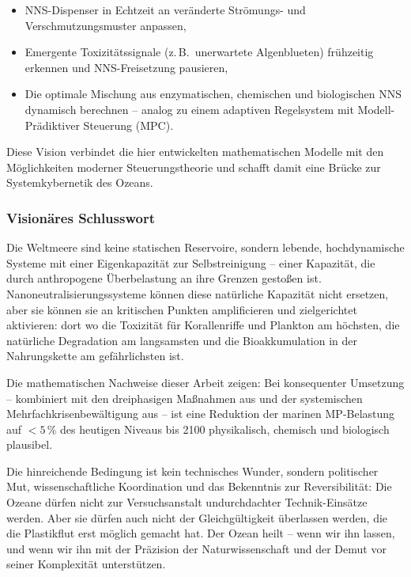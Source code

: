 ﻿\documentclass[12pt,a4paper]{article}
\theoremstyle{definition}
\theoremstyle{remark}
\begin{document}
\begin{itemize}
  \item NNS-Dispenser in Echtzeit an veränderte Strömungs- und
        Verschmutzungsmuster anpassen,
  \item Emergente Toxizitätssignale (z.\,B.\ unerwartete Algenblueten)
        frühzeitig erkennen und NNS-Freisetzung pausieren,
  \item Die optimale Mischung aus enzymatischen, chemischen und
        biologischen NNS dynamisch berechnen -- analog zu einem
        adaptiven Regelsystem mit Modell-Prädiktiver Steuerung (MPC).
\end{itemize}

Diese Vision verbindet die hier entwickelten mathematischen Modelle
mit den Möglichkeiten moderner Steuerungstheorie und schafft damit
eine Brücke zur Systemkybernetik des Ozeans.

\subsubsection{Visionäres Schlusswort}

Die Weltmeere sind keine statischen Reservoire, sondern lebende, hochdynamische
Systeme mit einer Eigenkapazität zur Selbstreinigung -- einer Kapazität,
die durch anthropogene Überbelastung an ihre Grenzen gestoßen ist.
Nanoneutralisierungssysteme können diese natürliche Kapazität nicht ersetzen,
aber sie können sie an kritischen Punkten amplificieren und zielgerichtet
aktivieren: dort wo die Toxizität für Korallenriffe und Plankton am höchsten,
die natürliche Degradation am langsamsten und die Bioakkumulation in der
Nahrungskette am gefährlichsten ist.

Die mathematischen Nachweise dieser Arbeit zeigen:
Bei konsequenter Umsetzung -- kombiniert mit den dreiphasigen Maßnahmen aus
\cite{cleanocn_epp2026} und der systemischen Mehrfachkrisenbewältigung aus
\cite{ocnscnce_epp2026} -- ist eine Reduktion der marinen MP-Belastung auf
$< 5\,\%$ des heutigen Niveaus bis 2100 physikalisch, chemisch und biologisch
plausibel.

Die hinreichende Bedingung ist kein technisches Wunder, sondern politischer Mut,
wissenschaftliche Koordination und das Bekenntnis zur Reversibilität:
Die Ozeane dürfen nicht zur Versuchsanstalt undurchdachter Technik-Einsätze
werden. Aber sie dürfen auch nicht der Gleichgültigkeit überlassen werden,
die die Plastikflut erst möglich gemacht hat. Der Ozean heilt -- wenn wir
ihn lassen, und wenn wir ihn mit der Präzision der Naturwissenschaft
und der Demut vor seiner Komplexität unterstützen.
\end{document}

